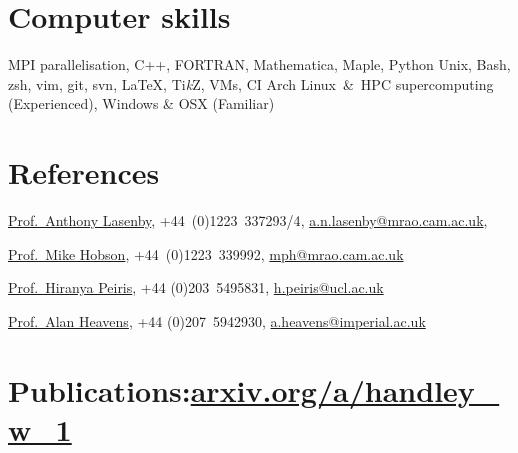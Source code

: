 \documentclass[11pt,a4paper,sans]{moderncv}
\begin{document}
\section{Computer skills}
 {MPI parallelisation, C++, FORTRAN, Mathematica, Maple, Python}
   {Unix, Bash, zsh, vim, git, svn, \LaTeX, Ti\textit{k}Z, VMs, CI}
          {Arch Linux~\&~HPC supercomputing (Experienced), Windows \& OSX (Familiar)}


\section{References}
\href{https://www.kicc.cam.ac.uk/directory/anl1000}{Prof.\ Anthony Lasenby}, {+44~(0)1223~337293/4}, \href{mailto:a.n.lasenby@mrao.cam.ac.uk}{a.n.lasenby@mrao.cam.ac.uk}, 

\href{https://www.phy.cam.ac.uk/directory/hobsonm}{Prof.\ Mike Hobson}, {+44~(0)1223~339992}, \href{mailto:mph@mrao.cam.ac.uk}{mph@mrao.cam.ac.uk} 

\href{https://www.ucl.ac.uk/cosmoparticle/hiranya-peiris}{Prof.\ Hiranya Peiris}, {+44 (0)203~5495831}, \href{mailto:h.peiris@ucl.ac.uk}{h.peiris@ucl.ac.uk} 


\href{https://www.imperial.ac.uk/people/a.heavens}{Prof.\ Alan Heavens}, {+44 (0)207~5942930}, \href{mailto:a.heavens@imperial.ac.uk}{a.heavens@imperial.ac.uk} 

\section{Publications:\hfill  \href{https://arxiv.org/a/handley_w_1.html}{arxiv.org/a/handley\_w\_1}}


{\small
{}
}
\end{document}
